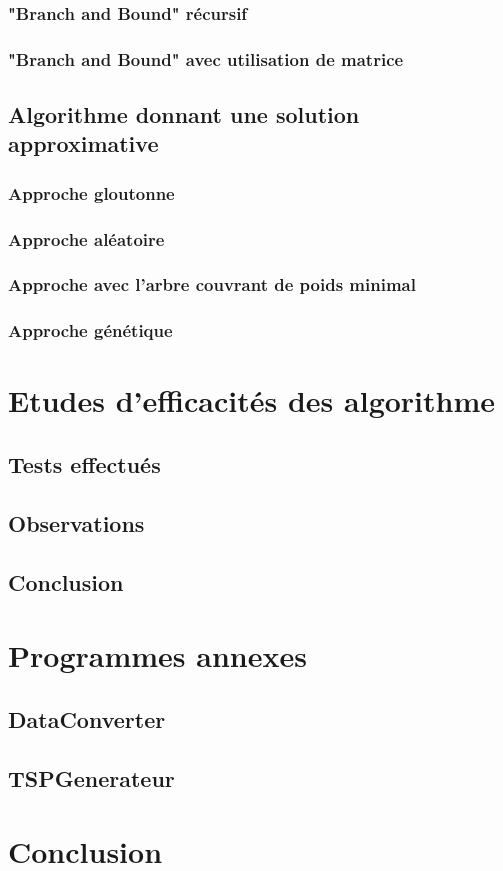 \documentclass[10pt,a4paper]{report}
\begin{document}
		\subsubsection{"Branch and Bound" récursif}	
		
		\subsubsection{"Branch and Bound" avec utilisation de matrice}	
		
	\subsection{Algorithme donnant une solution approximative}
	
		\subsubsection{Approche gloutonne}
		
		\subsubsection{Approche aléatoire}
		
		\subsubsection{Approche avec l'arbre couvrant de poids minimal}
		
		\subsubsection{Approche génétique}
		
\section{Etudes d'efficacités des algorithme}

	\subsection{Tests effectués}
	
	\subsection{Observations}
	
	\subsection{Conclusion}

\section{Programmes annexes}

	\subsection{DataConverter}
	
	\subsection{TSPGenerateur}
	
\section{Conclusion}
	
\end{document}
